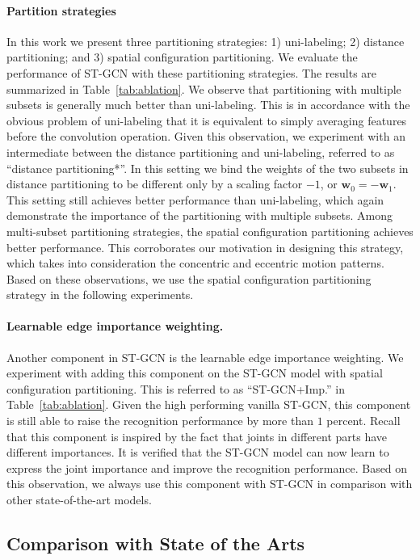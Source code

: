 \documentclass[letterpaper]{article} \usepackage{aaai18}  \usepackage{times}  \usepackage{helvet}  \usepackage{courier}  \usepackage{url}  \usepackage{graphicx}
\begin{document}
\paragraph{Partition strategies}
In this work we present three partitioning strategies: 1) uni-labeling; 2) distance partitioning; and 3) spatial configuration partitioning.
We evaluate the performance of ST-GCN with these partitioning strategies.
The results are summarized in Table~\ref{tab:ablation}.
We observe that partitioning with multiple subsets is generally much better than uni-labeling. 
This is in accordance with the obvious problem of uni-labeling that it is equivalent to simply averaging features before the convolution operation.
Given this observation, we experiment with an intermediate between the distance partitioning and uni-labeling, referred to as ``distance partitioning*''.
In this setting we bind the weights of the two subsets in distance partitioning to be different only by a scaling factor $-1$, or $ \mathbf{w}_0 = -\mathbf{w}_1 $.
This setting still achieves better performance than uni-labeling, which again demonstrate the importance of the partitioning with multiple subsets.
Among multi-subset partitioning strategies, the spatial configuration partitioning achieves better performance.
This corroborates our motivation in designing this strategy, which takes into consideration the concentric and eccentric motion patterns.
Based on these observations, we use the spatial configuration partitioning strategy in the following experiments.


\paragraph{Learnable edge importance weighting.}
Another component in ST-GCN is the learnable edge importance weighting. 
We experiment with adding this component on the ST-GCN model with spatial configuration partitioning.
This is referred to as ``ST-GCN+Imp.'' in Table~\ref{tab:ablation}.
Given the high performing vanilla ST-GCN, this component is still able to raise the recognition performance by more than $ 1 $ percent.
Recall that this component is inspired by the fact that joints in different parts have different importances.
It is verified that the ST-GCN model can now learn to express the joint importance and improve the recognition performance.
Based on this observation, we always use this component with ST-GCN in comparison with other state-of-the-art models.


\subsection{Comparison with State of the Arts}
\end{document}
